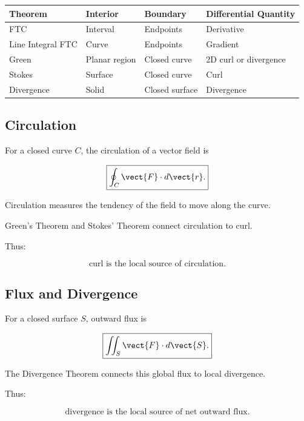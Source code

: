 \begin{center}
\begin{tabularx}{\textwidth}{@{}lXXX@{}}
\toprule
\textbf{Theorem} &
\textbf{Interior} &
\textbf{Boundary} &
\textbf{Differential Quantity}\\
\midrule
FTC &
Interval &
Endpoints &
Derivative\\
Line Integral FTC &
Curve &
Endpoints &
Gradient\\
Green &
Planar region &
Closed curve &
2D curl or divergence\\
Stokes &
Surface &
Closed curve &
Curl\\
Divergence &
Solid &
Closed surface &
Divergence\\
\bottomrule
\end{tabularx}
\end{center}

\subsection{Circulation}
\label{subsec:circulation}

For a closed curve \(C\), the circulation of a vector field is

\[ \boxed{\oint_C\vect{F}\cdot d\vect{r}.} \]

Circulation measures the tendency of the field to move along the curve.

Green's Theorem and Stokes' Theorem connect circulation to curl.

Thus:

\[ \boxed{\text{curl is the local source of circulation}.} \]

\subsection{Flux and Divergence}
\label{subsec:flux-and-divergence}

For a closed surface \(S\), outward flux is

\[ \boxed{\iint_S\vect{F}\cdot d\vect{S}.} \]

The Divergence Theorem connects this global flux to local divergence.

Thus:

\[ \boxed{\text{divergence is the local source of net outward flux}.} \]


